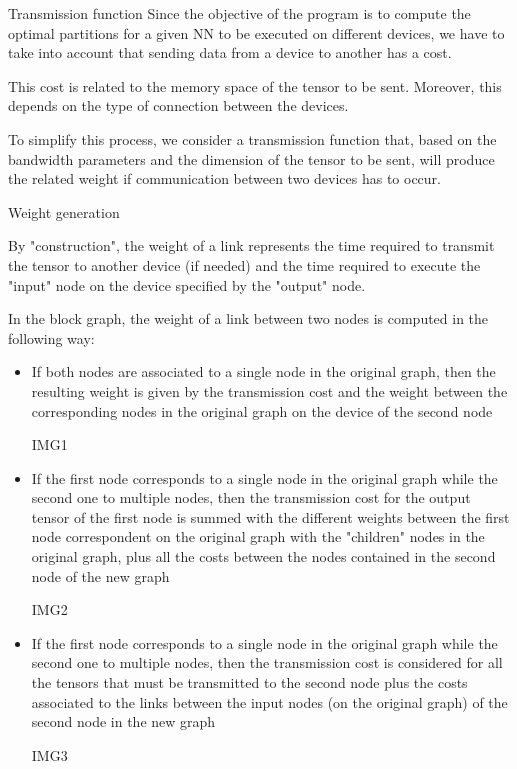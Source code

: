 \begin{frame}{Transmission function}
    Since the objective of the program is to compute the optimal partitions for a given NN to be executed on different devices, we have to take into account that sending data from a device to another has a cost. 
    
    This cost is related to the memory space of the tensor to be sent. Moreover, this depends on the type of connection between the devices. 
    
    To simplify this process, we consider a transmission function that, based on the bandwidth parameters and the dimension of the tensor to be sent, will produce the related weight if communication between two devices has to occur.
\end{frame}

\begin{frame}[allowframebreaks]{Weight generation}

    By "construction", the weight of a link represents the time required to transmit the tensor to another device (if needed) and the time required to execute the "input" node on the device specified by the "output" node.
    
    In the block graph, the weight of a link between two nodes is computed in the following way:
    \begin{itemize}
        \item If both nodes are associated to a single node in the original graph, then the resulting weight is given by the transmission cost and the weight between the corresponding nodes in the original graph on the device of the second node
        
        IMG1
        \framebreak
        
        \item If the first node corresponds to a single node in the original graph while the second one to multiple nodes, then the transmission cost for the output tensor of the first node is summed with the different weights between the first node correspondent on the original graph with the "children" nodes in the original graph, plus all the costs between the nodes contained in the second node of the new graph
        
        IMG2
        \framebreak
        
        \item If the first node corresponds to a single node in the original graph while the second one to multiple nodes, then the transmission cost is considered for all the tensors that must be transmitted to the second node plus the costs associated to the links between the input nodes (on the original graph) of the second node in the new graph
        
        IMG3
    \end{itemize}
    
\end{frame}